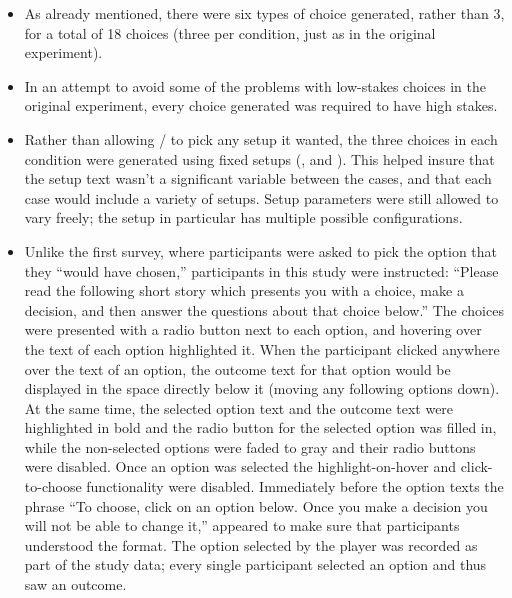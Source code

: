 \begin{itemize}
  \item%
    As already mentioned, there were six types of choice generated, rather than 3, for a total of 18 choices (three per condition, just as in the original experiment).

  \item%
    In an attempt to avoid some of the problems with low-stakes choices in the original experiment, every choice generated was required to have high stakes.

  \item%
    Rather than allowing \dunyazad/ to pick any setup it wanted, the three choices in each condition were generated using fixed setups (,  and ).
    This helped insure that the setup text wasn't a significant variable between the cases, and that each case would include a variety of setups.
    Setup parameters were still allowed to vary freely; the  setup in particular has multiple possible configurations.

  \item%
    Unlike the first survey, where participants were asked to pick the option that they ``would have chosen,'' participants in this study were instructed:
    ``Please read the following short story which presents you with a choice, make a decision, and then answer the questions about that choice below.''
    The choices were presented with a radio button next to each option, and hovering over the text of each option highlighted it.
    When the participant clicked anywhere over the text of an option, the outcome text for that option would be displayed in the space directly below it (moving any following options down).
    At the same time, the selected option text and the outcome text were highlighted in bold and the radio button for the selected option was filled in, while the non-selected options were faded to gray and their radio buttons were disabled.
    Once an option was selected the highlight-on-hover and click-to-choose functionality were disabled.
    Immediately before the option texts the phrase ``To choose, click on an option below. Once you make a decision you will not be able to change it,'' appeared to make sure that participants understood the format.
    The option selected by the player was recorded as part of the study data; every single participant selected an option and thus saw an outcome.


\end{itemize}
